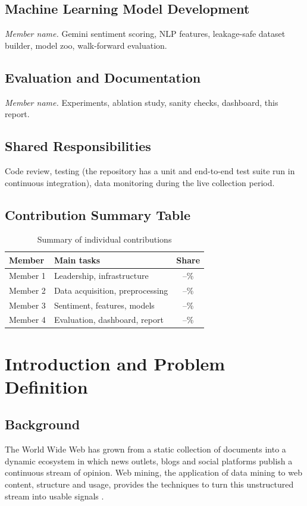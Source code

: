 \documentclass[12pt,a4paper,oneside]{report}
\begin{document}
\section{Machine Learning Model Development}
\emph{Member name.} Gemini sentiment scoring, NLP features, leakage-safe
dataset builder, model zoo, walk-forward evaluation.

\section{Evaluation and Documentation}
\emph{Member name.} Experiments, ablation study, sanity checks, dashboard,
this report.

\section{Shared Responsibilities}
Code review, testing (the repository has a unit and end-to-end test suite
run in continuous integration), data monitoring during the live collection
period.

\section{Contribution Summary Table}
\begin{table}[H]
  \centering
  \caption{Summary of individual contributions}
  \label{tab:contrib}
  \begin{tabularx}{\linewidth}{lYc}
    \toprule
    \textbf{Member} & \textbf{Main tasks} & \textbf{Share} \\
    \midrule
    Member 1 & Leadership, infrastructure & --\% \\
    Member 2 & Data acquisition, preprocessing & --\% \\
    Member 3 & Sentiment, features, models & --\% \\
    Member 4 & Evaluation, dashboard, report & --\% \\
    \bottomrule
  \end{tabularx}
\end{table}

\chapter{Introduction and Problem Definition}\label{ch:intro}

\section{Background}
The World Wide Web has grown from a static collection of documents into a
dynamic ecosystem in which news outlets, blogs and social platforms publish
a continuous stream of opinion. Web mining, the application of data mining
to web content, structure and usage, provides the techniques to turn this
unstructured stream into usable signals \citep{liu2012sentiment}.
\end{document}
